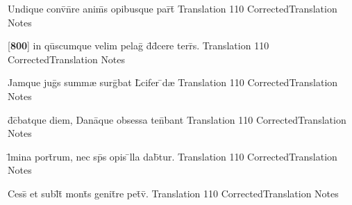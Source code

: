 \latline
  {Undique conv\={}n\={}re anim\={\macron {\i}}s opibusque par\={}t\={\macron {\i}}}
  { Translation }
  {110}
  { CorrectedTranslation }
  { Notes }


\latline
  {[\textbf{800}] in qu\={}scumque velim pelag\={} d\={}d\={}cere terr\={}s.}
  { Translation }
  {110}
  { CorrectedTranslation }
  { Notes }


\latline
  {Jamque jug\={\macron {\i}}s summ{\ae} surg\={}bat L\={}cifer \={}d{\ae}}
  { Translation }
  {110}
  { CorrectedTranslation }
  { Notes }


\latline
  {d\={}c\={}batque diem, Dana\={\macron {\i}}que obsessa ten\={}bant}
  { Translation }
  {110}
  { CorrectedTranslation }
  { Notes }


\latline
  {l\={\macron {\i}}mina port\={}rum, nec sp\={}s opis \={}lla dab\={}tur.}
  { Translation }
  {110}
  { CorrectedTranslation }
  { Notes }


\latline
  {Cess\={\macron {\i}} et subl\={}t\={} mont\={\macron {\i}}s genit\={}re pet\={\macron {\i}}v\={\macron {\i}}.}
  { Translation }
  {110}
  { CorrectedTranslation }
  { Notes }


